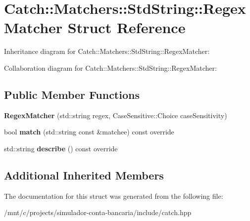 \hypertarget{structCatch_1_1Matchers_1_1StdString_1_1RegexMatcher}{}\section{Catch\+:\+:Matchers\+:\+:Std\+String\+:\+:Regex\+Matcher Struct Reference}
\label{structCatch_1_1Matchers_1_1StdString_1_1RegexMatcher}


Inheritance diagram for Catch\+:\+:Matchers\+:\+:Std\+String\+:\+:Regex\+Matcher\+:


Collaboration diagram for Catch\+:\+:Matchers\+:\+:Std\+String\+:\+:Regex\+Matcher\+:
\subsection*{Public Member Functions}
\begin{DoxyCompactItemize}
\item 
\mbox{\label{structCatch_1_1Matchers_1_1StdString_1_1RegexMatcher_ab914deb885fe25558c41ab368c6b3916}} 
{\bfseries Regex\+Matcher} (std\+::string regex, Case\+Sensitive\+::\+Choice case\+Sensitivity)
\item 
\mbox{\label{structCatch_1_1Matchers_1_1StdString_1_1RegexMatcher_aa8e61adccabb2f36133029301f6b8f4e}} 
bool {\bfseries match} (std\+::string const \&matchee) const override
\item 
\mbox{\label{structCatch_1_1Matchers_1_1StdString_1_1RegexMatcher_a1f788cd5258c987e5043f6c7f43adeb9}} 
std\+::string {\bfseries describe} () const override
\end{DoxyCompactItemize}
\subsection*{Additional Inherited Members}


The documentation for this struct was generated from the following file\+:\begin{DoxyCompactItemize}
\item 
/mnt/c/projects/simulador-\/conta-\/bancaria/include/catch.\+hpp\end{DoxyCompactItemize}
